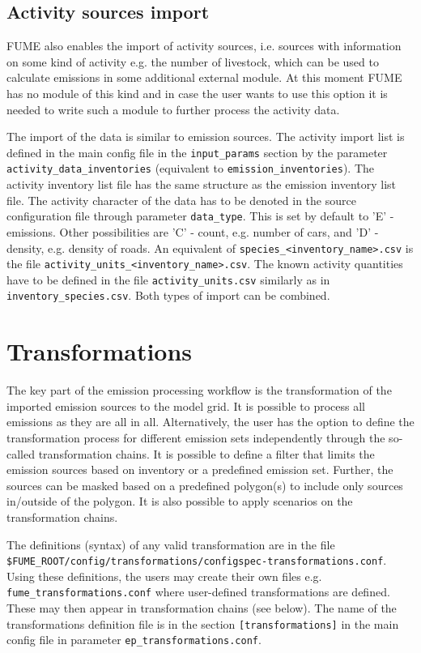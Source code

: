 \documentclass[a4paper,11pt]{article}
\begin{document}
\subsection{Activity sources import}\label{activity-sources}
FUME also enables the import of activity sources, i.e. sources with information on some kind of activity e.g. the number of livestock, which can be used to calculate emissions in some additional external module. At this moment FUME has no module of this kind and in case the user wants to use this option it is needed to write such a module to further process the activity data. 

The import of the data is similar to emission sources. The activity import list is defined in the main config file in the \verb|input_params| section by the parameter \verb|activity_data_inventories| (equivalent to \verb|emission_inventories|). The activity inventory list file has the same structure as the emission inventory list file. The activity character of the data has to be denoted in the source configuration file through parameter \verb|data_type|. This is set by default to 'E' - emissions. Other possibilities are 'C' - count, e.g. number of cars, and 'D' - density, e.g. density of roads. An equivalent of \verb|species_<inventory_name>.csv| is the file \verb|activity_units_<inventory_name>.csv|. The known activity quantities have to be defined in the file \verb|activity_units.csv| similarly as in \verb|inventory_species.csv|.
Both types of import can be combined.

\section{Transformations}\label{transformations}
The key part of the emission processing workflow is the transformation of the imported emission sources to the model grid. It is possible to process all emissions as they are all in all. Alternatively, the user has the option to define the transformation process for different emission sets independently through the so-called transformation chains. It is possible to define a filter that limits the emission sources based on inventory or a predefined emission set. Further, the sources can be masked based on a predefined polygon(s) to include only sources in/outside of the polygon. It is also possible to apply scenarios on the transformation chains. 

The definitions (syntax) of any valid transformation are in the file\\
\verb|$FUME_ROOT/config/transformations/configspec-transformations.conf|. Using these
definitions, the users may create their own files e.g.
\verb|fume_transformations.conf| where user-defined transformations are
defined. These may then appear in transformation chains (see below).
The name of the transformations definition file is in the section \verb|[transformations]| in the main config file in parameter 
\verb|ep_transformations.conf|.
\end{document}
